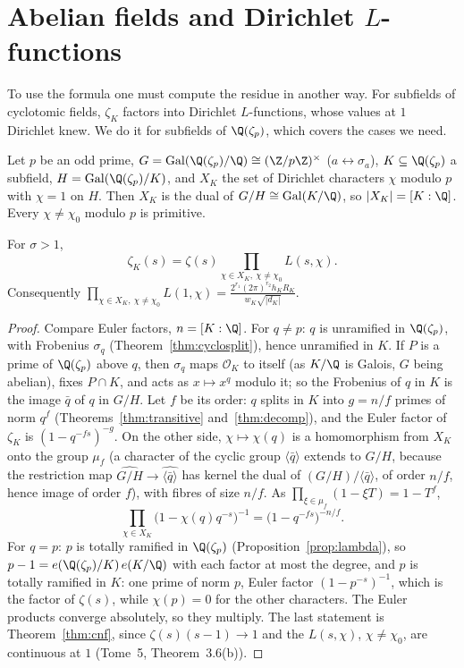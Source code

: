 \section{Abelian fields and Dirichlet \texorpdfstring{$L$}{L}-functions}

To use the formula one must compute the residue in another way. For subfields of cyclotomic fields, $\zeta_K$ factors into Dirichlet
$L$-functions, whose values at $1$ Dirichlet knew. We do it for subfields of $\Q(\zeta_p)$, which covers the cases we need.

Let $p$ be an odd prime, $G=\operatorname{Gal}(\Q(\zeta_p)/\Q)\cong(\Z/p\Z)^\times$ ($a\leftrightarrow\sigma_a$), $K\subseteq\Q(\zeta_p)$ a
subfield, $H=\operatorname{Gal}(\Q(\zeta_p)/K)$, and $X_K$ the set of Dirichlet characters $\chi$ modulo $p$ with $\chi=1$ on $H$. Then
$X_K$ is the dual of $G/H\cong\operatorname{Gal}(K/\Q)$, so $|X_K|=[K:\Q]$. Every $\chi\ne\chi_0$ modulo $p$ is primitive.

\begin{theorem}\label{thm:zetaab}
For $\sigma>1$,
\[
\zeta_K(s)=\zeta(s)\prod_{\chi\in X_K,\ \chi\ne\chi_0}L(s,\chi).
\]
Consequently $\displaystyle\prod_{\chi\in X_K,\ \chi\ne\chi_0}L(1,\chi)=\frac{2^{r_1}(2\pi)^{r_2}h_KR_K}{w_K\sqrt{|d_K|}}$.
\end{theorem}
\begin{proof}
Compare Euler factors, $n=[K:\Q]$. For $q\ne p$: $q$ is unramified in $\Q(\zeta_p)$, with Frobenius $\sigma_q$ (Theorem~\ref{thm:cyclosplit}),
hence unramified in $K$. If $P$ is a prime of $\Q(\zeta_p)$ above $q$, then $\sigma_q$ maps $\mathcal O_K$ to itself (as $K/\Q$ is Galois,
$G$ being abelian), fixes $P\cap K$, and acts as $x\mapsto x^q$ modulo it; so the Frobenius of $q$ in $K$ is the image $\bar q$ of $q$
in $G/H$. Let $f$ be its order: $q$ splits in $K$ into $g=n/f$ primes of norm $q^f$ (Theorems~\ref{thm:transitive} and~\ref{thm:decomp}),
and the Euler factor of $\zeta_K$ is $(1-q^{-fs})^{-g}$. On the other side, $\chi\mapsto\chi(q)$ is a homomorphism from $X_K$ onto
the group $\mu_f$ (a character of the cyclic group $\langle\bar q\rangle$ extends to $G/H$, because the restriction map
$\widehat{G/H}\to\widehat{\langle\bar q\rangle}$ has kernel the dual of $(G/H)/\langle\bar q\rangle$, of order $n/f$, hence image of order
$f$), with fibres of size $n/f$. As $\prod_{\xi\in\mu_f}(1-\xi T)=1-T^f$,
\[
\prod_{\chi\in X_K}\bigl(1-\chi(q)q^{-s}\bigr)^{-1}=\bigl(1-q^{-fs}\bigr)^{-n/f}.
\]
For $q=p$: $p$ is totally ramified in $\Q(\zeta_p)$ (Proposition~\ref{prop:lambda}), so $p-1=e(\Q(\zeta_p)/K)\,e(K/\Q)$ with each factor at
most the degree, and $p$ is totally ramified in $K$: one prime of norm $p$, Euler factor $(1-p^{-s})^{-1}$, which is the factor of
$\zeta(s)$, while $\chi(p)=0$ for the other characters. The Euler products converge absolutely, so they multiply. The last statement
is Theorem~\ref{thm:cnf}, since $\zeta(s)(s-1)\to1$ and the $L(s,\chi)$, $\chi\ne\chi_0$, are continuous at $1$ (Tome~5,
Theorem~3.6(b)).
\end{proof}

